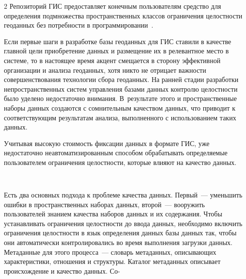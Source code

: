 \begin{multicols}{2}
      Репозиторий ГИС предоставляет конечным пользователям средство для 
определения подмножества пространственных классов ограничения целостности 
геоданных без потребности в программировании~\cite{5dul, 7dul}.
      
      Если первые шаги в разработке базы геоданных для ГИС ставили в качестве 
главной цели приобретение данных и размещение их в релевантное место в сис\-те\-ме, то в 
настоящее время акцент смещается в сторону эффективной организации и анализа 
геоданных, хотя никто не отрицает важности совершенствования технологии сбора 
геоданных. На ранней стадии разработки непространственных сис\-тем управления базами 
данных контролю целостности было уделено недостаточно внимания. В~результате этого 
и пространственные наборы данных создаются с сомнительным качеством данных, что 
приводит к соответствующим результатам анализа, выполненного с использованием 
таких данных.
      
      Учитывая высокую стоимость фиксации данных в формате ГИС, уже недостаточно 
неавтоматизированным способом обрабатывать определяемые пользователем ограничения 
целостности, которые влияют на качество данных. 

\begin{figure} %
 \vspace*{1pt}
 \begin{center}
 \mbox{%
 \epsfxsize=114.043mm
 }
 \end{center}
 \vspace*{-9pt}
\vspace*{6pt}
\end{figure}
      
      Есть два основных подхода к проблеме качества данных. Первый~--- уменьшить 
ошибки в пространственных наборах данных, второй~--- вооружить пользователей 
знанием качества наборов данных и их содержания. Чтобы устанавливать ограничения 
целостности до ввода данных, необходимо включить ограничения целостности в язык 
определения данных базы данных так, чтобы они автоматически контролировались во 
время выполнения загрузки данных. Метаданные для этого процесса~--- словарь 
метаданных, описывающих характеристики, отношения и структуры. Каталог метаданных 
описывает происхождение и качество данных. Со-\linebreak\vspace*{-12pt}

\pagebreak




\end{multicols}
